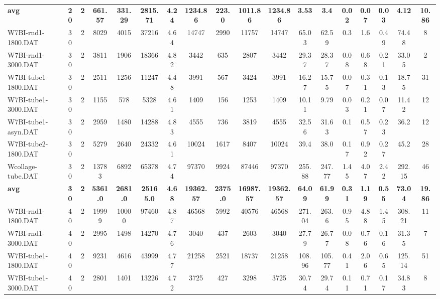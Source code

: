 \begin{sidewaystable}[h]
{\begin{tabular}{lccccccccccccccccc}
\cline{1-18} \textbf{avg} & \textbf{20} & \textbf{2} & \textbf{661.57} & \textbf{331.29} & \textbf{2815.71} & \textbf{4.24} & \textbf{1234.86} & \textbf{223.0} & \textbf{1011.86} & \textbf{1234.86} & \textbf{3.53} & \textbf{3.4} & \textbf{0.02} & \textbf{0.07} & \textbf{0.03} & \textbf{4.12} & \textbf{10.86} \\ \cline{1-18}
W7BI-rnd1-1800.DAT & 30 & 2 & 8029 & 4015 & 37216 & 4.64 & 14747 & 2990 & 11757 & 14747 & 65.03 & 62.59 & 0.3 & 1.6 & 0.49 & 74.48 & 8\\
W7BI-rnd1-3000.DAT & 30 & 2 & 3811 & 1906 & 18366 & 4.82 & 3442 & 635 & 2807 & 3442 & 29.37 & 28.37 & 0.08 & 0.68 & 0.21 & 33.05 & 2\\
W7BI-tube1-1800.DAT & 30 & 2 & 2511 & 1256 & 11247 & 4.48 & 3991 & 567 & 3424 & 3991 & 16.27 & 15.75 & 0.07 & 0.31 & 0.13 & 18.75 & 31\\
W7BI-tube1-3000.DAT & 30 & 2 & 1155 & 578 & 5328 & 4.61 & 1409 & 156 & 1253 & 1409 & 10.11 & 9.79 & 0.03 & 0.21 & 0.07 & 11.42 & 12\\
W7BI-tube1-asyn.DAT & 30 & 2 & 2959 & 1480 & 14288 & 4.83 & 4555 & 736 & 3819 & 4555 & 32.56 & 31.63 & 0.1 & 0.57 & 0.23 & 36.2 & 12\\
W7BI-tube2-1800.DAT & 30 & 2 & 5279 & 2640 & 24332 & 4.61 & 10024 & 1617 & 8407 & 10024 & 39.4 & 38.0 & 0.17 & 0.92 & 0.27 & 45.2 & 28\\
Wcollage-tube.DAT & 30 & 2 & 13783 & 6892 & 65378 & 4.74 & 97370 & 9924 & 87446 & 97370 & 255.88 & 247.77 & 1.45 & 4.07 & 2.42 & 292.15 & 46\\
\cline{1-18} \textbf{avg} & \textbf{30} & \textbf{2} & \textbf{5361.0} & \textbf{2681.0} & \textbf{25165.0} & \textbf{4.68} & \textbf{19362.57} & \textbf{2375.0} & \textbf{16987.57} & \textbf{19362.57} & \textbf{64.09} & \textbf{61.99} & \textbf{0.31} & \textbf{1.19} & \textbf{0.55} & \textbf{73.04} & \textbf{19.86} \\ \cline{1-18}
W7BI-rnd1-1800.DAT & 40 & 2 & 19999 & 10000 & 97460 & 4.87 & 46568 & 5992 & 40576 & 46568 & 271.04 & 263.6 & 0.95 & 4.88 & 1.45 & 308.21 & 11\\
W7BI-rnd1-3000.DAT & 40 & 2 & 2995 & 1498 & 14270 & 4.76 & 3040 & 437 & 2603 & 3040 & 27.79 & 26.77 & 0.08 & 0.76 & 0.16 & 31.35 & 7\\
W7BI-tube1-1800.DAT & 40 & 2 & 9231 & 4616 & 43999 & 4.77 & 21258 & 2521 & 18737 & 21258 & 108.96 & 105.77 & 0.41 & 2.06 & 0.65 & 125.14 & 51\\
W7BI-tube1-3000.DAT & 40 & 2 & 2801 & 1401 & 13226 & 4.72 & 3725 & 427 & 3298 & 3725 & 30.74 & 29.74 & 0.11 & 0.71 & 0.17 & 34.83 & 8\\

\end{tabular}}
\end{sidewaystable}

